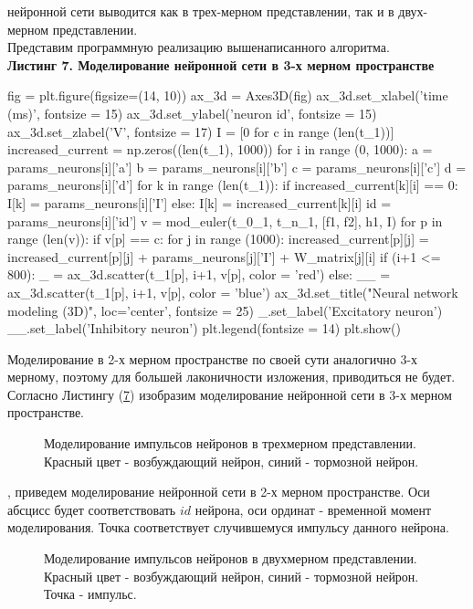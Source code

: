  нейронной сети выводится как в трех-мерном представлении, так и в двух-мерном представлении. \\
Представим программную реализацию вышенаписанного алгоритма. \\
\textbf{Листинг 7. Моделирование нейронной сети в 3-х мерном пространстве}
\hypertarget{lst10}{}
\begin{python}
fig = plt.figure(figsize=(14, 10))
ax_3d = Axes3D(fig)
ax_3d.set_xlabel('time (ms)', fontsize = 15)
ax_3d.set_ylabel('neuron id', fontsize = 15)
ax_3d.set_zlabel('V', fontsize = 17)
I = [0 for c  in range (len(t_1))]
increased_current = np.zeros((len(t_1), 1000))
for i in range (0, 1000):
    a = params_neurons[i]['a']
    b = params_neurons[i]['b']
    c = params_neurons[i]['c']
    d = params_neurons[i]['d']
    for k in range (len(t_1)):
      if increased_current[k][i] == 0:
        I[k]  = params_neurons[i]['I']
      else:
        I[k] = increased_current[k][i]
    id = params_neurons[i]['id']
    v = mod_euler(t_0_1, t_n_1, [f1, f2], h1, I)
    for p in range (len(v)):
      if v[p] == c:
        for j in range (1000):
          increased_current[p][j] = increased_current[p][j] + params_neurons[j]['I'] +  W_matrix[j][i]
        if (i+1 <= 800):
          _ = ax_3d.scatter(t_1[p], i+1, v[p], color = 'red')
        else: 
          __ = ax_3d.scatter(t_1[p], i+1, v[p], color = 'blue')
ax_3d.set_title("Neural network modeling (3D)", loc='center', fontsize = 25)
_.set_label('Excitatory neuron')
__.set_label('Inhibitory neuron')
plt.legend(fontsize = 14)
plt.show()
\end{python}
\indent Моделирование в 2-х мерном пространстве по своей сути аналогично 3-х мерному, поэтому для большей лаконичности изложения, приводиться не будет. \\
Согласно Листингу (\hyperlink{lst10}{7}) изобразим моделирование нейронной сети в 3-х мерном пространстве. 
\hypertarget{3d}{}
\begin{figure}[h!]
\center{\texttt{[image: 3d]}}
\caption{Моделирование импульсов нейронов в трехмерном представлении. Красный цвет - возбуждающий нейрон, синий - тормозной нейрон.}
\end{figure}
\clearpage
{}, приведем моделирование нейронной сети в 2-х мерном пространстве. Оси абсцисс будет соответствовать $id$ нейрона, оси ординат - временной момент моделирования. Точка соответствует случившемуся импульсу данного нейрона. \\
\hypertarget{2d}{}
\begin{figure}[h!]
\center{\texttt{[image: 2d]}}
\caption{Моделирование импульсов нейронов в двухмерном представлении. Красный цвет - возбуждающий нейрон, синий - тормозной нейрон. Точка - импульс.}
\end{figure}

